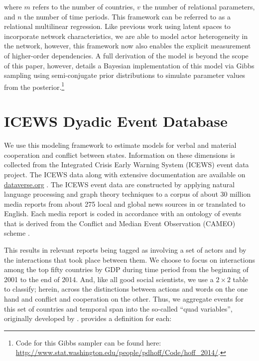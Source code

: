 \documentclass[3p,times,twocolumn,authoryear,12pt]{elsarticle}
\begin{document}
\noindent where $m$ refers to the number of countries, $v$ the number of relational parameters, and $n$ the number of time periods. This framework can be referred to as a relational multilinear regression. Like previous work using latent spaces to incorporate network characteristics, we are able to model actor heterogeneity in the network, however, this framework now also enables the explicit measurement of higher-order dependencies. A full derivation of the model is beyond the scope of this paper, however, \citet{hoff:2015} details a Bayesian implementation of this model via Gibbs sampling using semi-conjugate prior distributions to simulate parameter values from the posterior.\footnote{Code for this Gibbs sampler can be found here: \url{http://www.stat.washington.edu/people/pdhoff/Code/hoff_2014/}.}

\section{ICEWS Dyadic Event Database}

We use this modeling framework to estimate models for verbal and material cooperation and conflict between states. Information on these dimensions is collected from the Integrated Crisis Early Warning System (ICEWS) event data project. The ICEWS data along with extensive documentation are available on \url{dataverse.org} \citep{icews:2015:aggregations,icews:2015:data}. The ICEWS event data are constructed by applying natural language processing and graph theory techniques \citep{boschee:natarajan:etal:2013} to a corpus of about 30 million media reports from about 275 local and global news sources in or translated to English.  Each media report is coded in accordance with an ontology of events that is derived from the Conflict and Median Event Observation (CAMEO) scheme \citep{schrodt:etal:2009}. 

This results in relevant reports being tagged as involving a set of actors and by the interactions that took place between them. We choose to focus on interactions among the top fifty countries by GDP during time period from the beginning of 2001 to the end of 2014. And, like all good social scientists, we use a $2 \times 2$ table to classify; herein, across the distinctions between actions and words on the one hand and conflict and cooperation on the other.  Thus, we aggregate events for this set of countries and temporal span into the so-called ``quad variables'', originally developed by \citet{duval:thompson:1980}. \citet{yonamine:2011} provides a definition for each:
\end{document}
